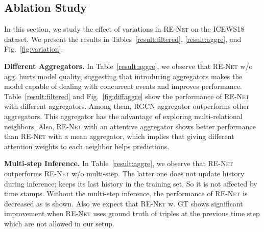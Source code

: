 \documentclass[11pt,a4paper]{article}
\newcommand{\method}{\textsc{RE-Net}\xspace}
\newcommand{\para}[1]{\smallskip\noindent\textbf{#1}}
\begin{document}
\subsection{Ablation Study}
\label{exp:ablation}
In this section, we study the effect of variations in \method on the ICEWS18 dataset.
We present the results in Tables~\ref{result:filtered}, \ref{result:aggre}, and Fig.~\ref{fig:variation}. 


\para{Different Aggregators.}
In Table~\ref{result:aggre}, we observe that \method w/o agg. hurts model quality, suggesting that introducing aggregators makes the model capable of dealing with concurrent events and improves performance.
Table~\ref{result:filtered} and Fig.~\ref{fig:diffaggre} show the performance of \method with different aggregators. 
Among them, RGCN aggregator outperforms other aggregators.
This aggregator has the advantage of exploring multi-relational neighbors. 
Also, \method with an attentive aggregator shows better performance than \method with a mean aggregator, which implies that giving different attention weights to each neighbor helps predictions.

\para{Multi-step Inference.}
In Table~\ref{result:aggre}, we observe that \method outperforms \method w/o multi-step. The latter one does not update history during inference; keeps its last history in the training set. So it is not affected by time stamps. 
Without the multi-step inference, the performance of \method is decreased as is shown.
Also we expect that \method w. GT shows significant improvement when \method uses ground truth of triples at the previous time step which are not allowed in our setup.

\end{document}
